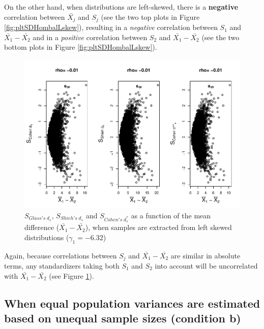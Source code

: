 \documentclass[
  english,
  man]{apa6}
\begin{document}
On the other hand, when distributions are left-skewed, there is a \textbf{negative} correlation between \(\bar{X_j}\) and \(S_j\) (see the two top plots in Figure \ref{fig:pltSDHombalLskew}), resulting in a \emph{negative} correlation between \(S_1\) and \(\bar{X_1}-\bar{X_2}\) and in a \emph{positive} correlation between \(S_2\) and \(\bar{X_1}-\bar{X_2}\) (see the two bottom plots in Figure \ref{fig:pltSDHombalLskew}).

\begin{figure}
\centering
\includegraphics{Correlation_files/figure-latex/pltStdzrHombalLskew-1.pdf}
\caption{\label{fig:pltStdzrHombalLskew}\(S_{Glass's \; d_s}\), \(S_{Shieh's \; d_s}\) and \(S_{Cohen's \; d^*_s}\) as a function of the mean difference (\(\bar{X_1}-\bar{X_2}\)), when samples are extracted from left skewed distributions (\(\gamma_1 = -6.32\))}
\end{figure}

Again, because correlations between \(S_j\) and \(\bar{X_1}-\bar{X_2}\) are similar in absolute terms, any standardizers taking both \(S_1\) and \(S_2\) into account will be uncorrelated with \(\bar{X_1}-\bar{X_2}\) (see Figure \ref{fig:pltStdzrHombalLskew}).

\hypertarget{when-equal-population-variances-are-estimated-based-on-unequal-sample-sizes-condition-b}{%
\subsection{When equal population variances are estimated based on unequal sample sizes (condition b)}\label{when-equal-population-variances-are-estimated-based-on-unequal-sample-sizes-condition-b}}
\end{document}

